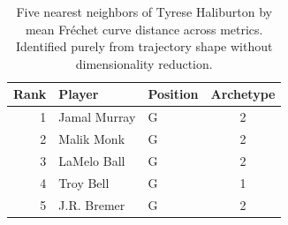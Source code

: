 \begin{table}[htbp]
  \centering\small
  \begin{tabular}{rllc}
    \toprule
    Rank & Player & Position & Archetype \\
    \midrule
    1 & Jamal Murray & G & 2 \\
    2 & Malik Monk & G & 2 \\
    3 & LaMelo Ball & G & 2 \\
    4 & Troy Bell & G & 1 \\
    5 & J.R. Bremer & G & 2 \\
    \bottomrule
  \end{tabular}
  \caption{Five nearest neighbors of Tyrese Haliburton by mean Fr\'{e}chet curve distance across metrics. Identified purely from trajectory shape without dimensionality reduction.}
  \label{tab:Tyrese_Haliburton_frechet_curve_neighbors}
\end{table}

